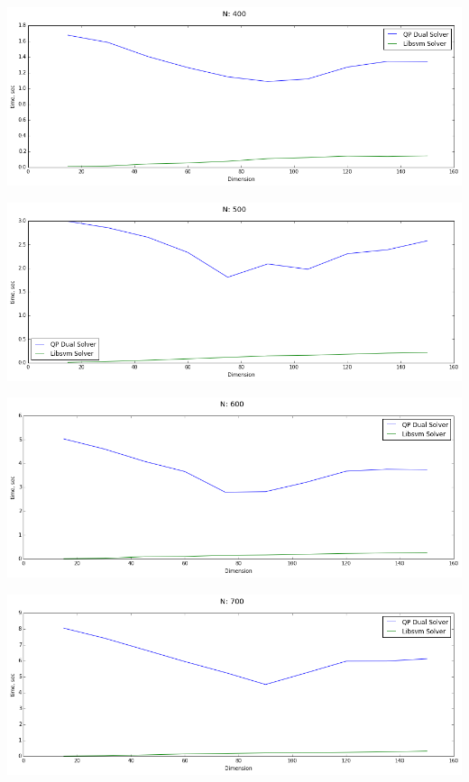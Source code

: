 \documentclass[12pt, a4paper]{article}
\begin{document}
			\begin{center}
				\includegraphics[width=18cm]{2par_N400_one.png}
			\end{center}

			\begin{center}
				\includegraphics[width=18cm]{2par_N500_one.png}
			\end{center}

			\begin{center}
				\includegraphics[width=18cm]{2par_N600_one.png}
			\end{center}

			\begin{center}
				\includegraphics[width=18cm]{2par_N700_one.png}
			\end{center}
\end{document}
